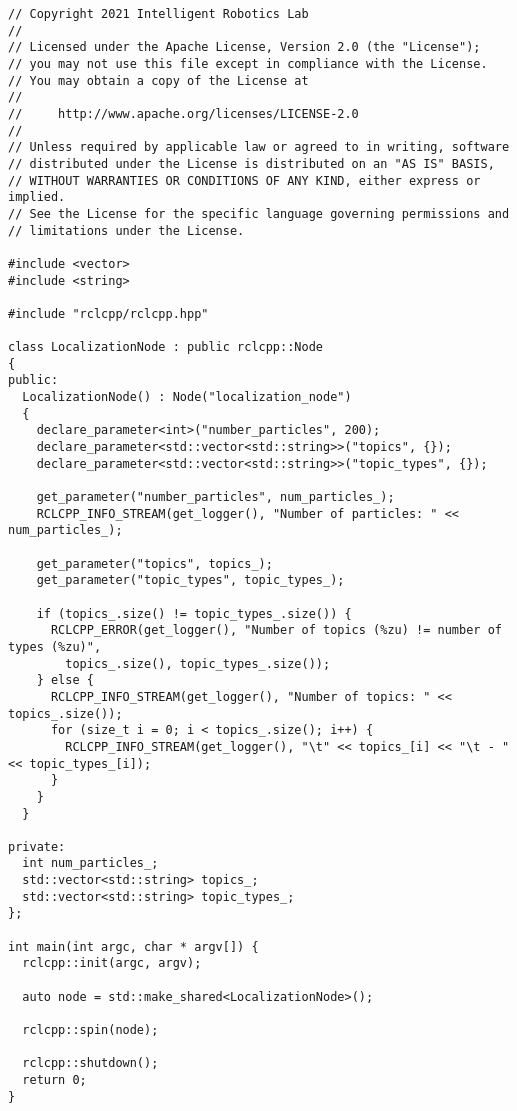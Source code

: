 \footnotesize
\begin{tcolorbox}[sharp corners, colframe=gray!80, colback=LightGray, left=0pt, top=0pt, bottom=0pt, title=\texttt{br2\_basics/src/param\_reader.cpp}]
  \begin{verbatim}
// Copyright 2021 Intelligent Robotics Lab
//
// Licensed under the Apache License, Version 2.0 (the "License");
// you may not use this file except in compliance with the License.
// You may obtain a copy of the License at
//
//     http://www.apache.org/licenses/LICENSE-2.0
//
// Unless required by applicable law or agreed to in writing, software
// distributed under the License is distributed on an "AS IS" BASIS,
// WITHOUT WARRANTIES OR CONDITIONS OF ANY KIND, either express or implied.
// See the License for the specific language governing permissions and
// limitations under the License.

#include <vector>
#include <string>

#include "rclcpp/rclcpp.hpp"  

class LocalizationNode : public rclcpp::Node
{
public:
  LocalizationNode() : Node("localization_node")
  {
    declare_parameter<int>("number_particles", 200);
    declare_parameter<std::vector<std::string>>("topics", {});
    declare_parameter<std::vector<std::string>>("topic_types", {});

    get_parameter("number_particles", num_particles_);
    RCLCPP_INFO_STREAM(get_logger(), "Number of particles: " << num_particles_);

    get_parameter("topics", topics_);
    get_parameter("topic_types", topic_types_);

    if (topics_.size() != topic_types_.size()) {
      RCLCPP_ERROR(get_logger(), "Number of topics (%zu) != number of types (%zu)",
        topics_.size(), topic_types_.size());
    } else {
      RCLCPP_INFO_STREAM(get_logger(), "Number of topics: " << topics_.size());
      for (size_t i = 0; i < topics_.size(); i++) {
        RCLCPP_INFO_STREAM(get_logger(), "\t" << topics_[i] << "\t - " << topic_types_[i]);
      }
    }
  }

private:
  int num_particles_;
  std::vector<std::string> topics_;
  std::vector<std::string> topic_types_;
};

int main(int argc, char * argv[]) { 
  rclcpp::init(argc, argv);  

  auto node = std::make_shared<LocalizationNode>();

  rclcpp::spin(node);

  rclcpp::shutdown();  
  return 0;  
}
    \end{verbatim}
    \end{tcolorbox}
  \normalsize

